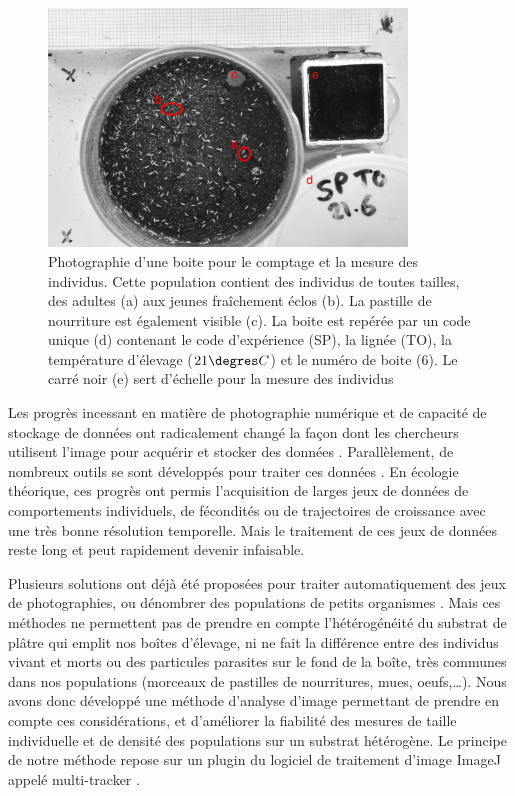 \begin{figure}[!ht]
\begin{center}
\includegraphics[width=0.85\textwidth]{1_CorpsDeThese/Methodo/PhotoCount}
\caption[ Photo d’une boite pour le
comptage et la mesure des individus]{Photographie d'une boite pour le comptage
et la mesure des individus. Cette population contient des individus de toutes
tailles, des adultes (a) aux jeunes fraîchement éclos (b). La pastille de
nourriture est également visible (c). La boite est repérée par un code unique
(d) contenant le code d'expérience (SP), la lignée (TO), la température
d'élevage ($21\degres C$) et le numéro de boite (6). Le carré noir (e) sert
d'échelle pour la mesure des individus}
\label{fig:photocount}
\end{center}
\end{figure}

Les progrès incessant en matière de photographie numérique et de capacité de
stockage de données ont radicalement changé la façon dont les chercheurs
utilisent l'image pour acquérir et stocker des données \autocites{walter2005a}.
Parallèlement, de nombreux outils se sont développés pour traiter ces données
\autocites{eliceiri2012a,schneider2012a}. En écologie théorique, ces progrès ont
permis l'acquisition de larges jeux de données de comportements individuels, de
fécondités ou de trajectoires de croissance avec une très bonne résolution
temporelle. Mais le traitement de ces jeux de données reste long et peut
rapidement devenir infaisable. 

Plusieurs solutions ont déjà été proposées pour traiter automatiquement des jeux
de photographies, ou dénombrer des populations de petits organismes
\autocites{hooper2006a,krogh1998a,auclerc2010a,lukas2009a,marcal2006a}. Mais ces
méthodes ne permettent pas de prendre en compte l'hétérogénéité du substrat de
plâtre qui emplit nos boîtes d'élevage, ni ne fait la différence entre des
individus vivant et  morts ou des particules parasites sur le fond de la
boîte, très communes dans nos populations (morceaux de pastilles de
nourritures, mues, oeufs,\ldots). Nous avons donc développé une méthode
d'analyse d'image permettant de prendre en compte ces considérations, et
d'améliorer la fiabilité des mesures de taille individuelle et de densité des
populations sur un substrat hétérogène. Le principe de notre méthode repose sur
un plugin du logiciel de traitement d'image ImageJ appelé multi-tracker
\autocites{schneider2012a,kuhn2001a}.

